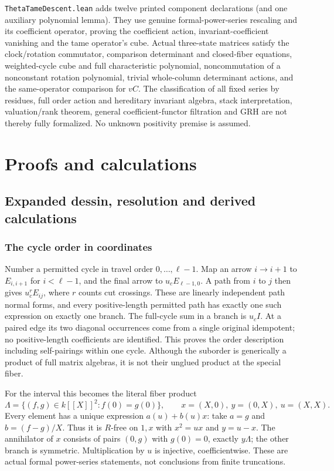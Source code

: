 \documentclass[11pt,oneside,openany]{book}
\theoremstyle{definition}\newtheorem{definition}[theorem]{Definition}
\theoremstyle{remark}\newtheorem{remark}[theorem]{Remark}
\begin{document}
\texttt{ThetaTameDescent.lean} adds twelve printed component declarations (and one auxiliary polynomial lemma). They use genuine formal-power-series rescaling and its coefficient operator, proving the coefficient action, invariant-coefficient vanishing and the tame operator's cube. Actual three-state matrices satisfy the clock/rotation commutator, comparison determinant and closed-fiber equations, weighted-cycle cube and full characteristic polynomial, noncommutation of a nonconstant rotation polynomial, trivial whole-column determinant actions, and the same-operator comparison for $vC$. The classification of all fixed series by residues, full order action and hereditary invariant algebra, stack interpretation, valuation/rank theorem, general coefficient-functor filtration and GRH are not thereby fully formalized. No unknown positivity premise is assumed.

\part{Proofs and calculations}

\chapter{Expanded dessin, resolution and derived calculations}
\section{The cycle order in coordinates}
Number a permitted cycle in travel order $0,\ldots,\ell-1$. Map an arrow $i\to i+1$ to $E_{i,i+1}$ for $i<\ell-1$, and the final arrow to $u_c E_{\ell-1,0}$. A path from $i$ to $j$ then gives $u_c^rE_{ij}$, where $r$ counts cut crossings. These are linearly independent path normal forms, and every positive-length permitted path has exactly one such expression on exactly one branch. The full-cycle sum in a branch is $u_c I$. At a paired edge its two diagonal occurrences come from a single original idempotent; no positive-length coefficients are identified. This proves the order description including self-pairings within one cycle. Although the suborder is generically a product of full matrix algebras, it is not their unglued product at the special fiber.

For the interval this becomes the literal fiber product
\[
 \Lambda=\{(f,g)\in k[[X]]^2:f(0)=g(0)\},\qquad
 x=(X,0),\ y=(0,X),\ u=(X,X).
\]
Every element has a unique expression $a(u)+b(u)x$: take $a=g$ and $b=(f-g)/X$. Thus it is $R$-free on $1,x$ with $x^2=ux$ and $y=u-x$. The annihilator of $x$ consists of pairs $(0,g)$ with $g(0)=0$, exactly $y\Lambda$; the other branch is symmetric. Multiplication by $u$ is injective, coefficientwise. These are actual formal power-series statements, not conclusions from finite truncations.
\end{document}
